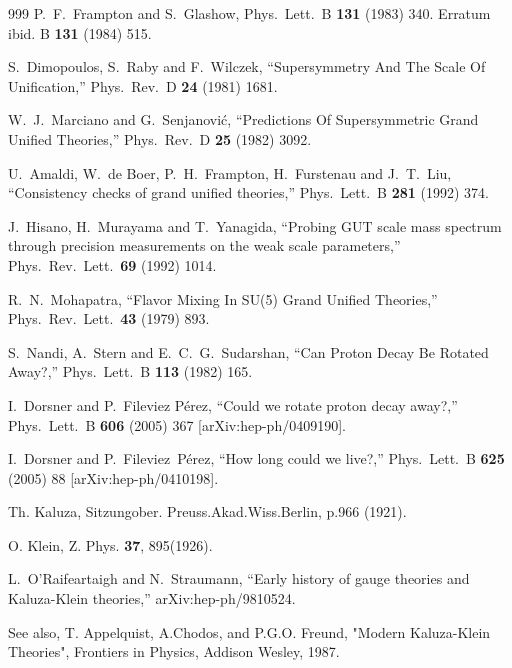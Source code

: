 \begin{thebibliography}{999}
P.~F.~Frampton and S.~Glashow,
Phys.\ Lett.\ B {\bf 131} (1983) 340. 
Erratum ibid. B {\bf 131} (1984) 515.

  S.~Dimopoulos, S.~Raby and F.~Wilczek,
  ``Supersymmetry And The Scale Of Unification,''
  Phys.\ Rev.\ D {\bf 24} (1981) 1681.

  W.~J.~Marciano and G.~Senjanovi\'c,
  ``Predictions Of Supersymmetric Grand Unified Theories,''
  Phys.\ Rev.\ D {\bf 25} (1982) 3092.

  U.~Amaldi, W.~de Boer, P.~H.~Frampton, H.~Furstenau and J.~T.~Liu,
  ``Consistency checks of grand unified theories,''
  Phys.\ Lett.\ B {\bf 281} (1992) 374.

  J.~Hisano, H.~Murayama and T.~Yanagida,
  ``Probing GUT scale mass spectrum through precision measurements on the weak
  scale parameters,''
  Phys.\ Rev.\ Lett.\  {\bf 69} (1992) 1014.

  R.~N.~Mohapatra,
  ``Flavor Mixing In SU(5) Grand Unified Theories,''
  Phys.\ Rev.\ Lett.\  {\bf 43} (1979) 893.

  S.~Nandi, A.~Stern and E.~C.~G.~Sudarshan,
  ``Can Proton Decay Be Rotated Away?,''
  Phys.\ Lett.\ B {\bf 113} (1982) 165.

  I.~Dorsner and P.~Fileviez P\'erez,
  ``Could we rotate proton decay away?,''
  Phys.\ Lett.\ B {\bf 606} (2005) 367
  [arXiv:hep-ph/0409190].

  I.~Dorsner and P.~Fileviez~P\'erez,
  ``How long could we live?,''
  Phys.\ Lett.\ B {\bf 625} (2005) 88
  [arXiv:hep-ph/0410198].

Th. Kaluza, Sitzungober. Preuss.Akad.Wiss.Berlin, p.966 (1921).

O. Klein, Z. Phys. {\bf 37}, 895(1926). 

  L.~O'Raifeartaigh and N.~Straumann,
  ``Early history of gauge theories and Kaluza-Klein theories,''
  arXiv:hep-ph/9810524.

See also, T. Appelquist, A.Chodos, and P.G.O. Freund, 
"Modern Kaluza-Klein Theories", Frontiers in Physics, Addison Wesley, 1987.


\end{thebibliography}
